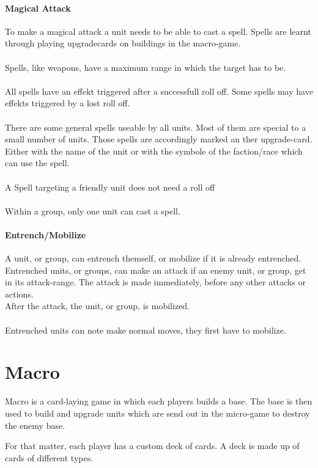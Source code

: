 \documentclass[a5paper,pagesize,10pt,bibtotoc,pointlessnumbers,
normalheadings,DIV=9,twoside=false]{scrbook}
\begin{document}
\subsubsection{Magical Attack}
To make a magical attack a unit needs to be able to cast a spell. Spells are learnt through playing upgradecards on buildings in the macro-game.\\
\\
Spells, like weapons, have a maximum range in which the target has to be.\\
\\
All spells have an effekt triggered after a successfull roll off. Some spells may have effekts triggered by a lost roll off.\\
\\
There are some general spells useable by all units. Most of them are special to a small number of units. Those spells are accordingly marked an ther upgrade-card. Either with the name of the unit or with the symbole of the faction/race which can use the spell.\\
\\
A Spell targeting a friendly unit does not need a roll off\\
\\
Within a group, only one unit can cast a spell.

\subsubsection{Entrench/Mobilize}
A unit, or group, can entrench themself, or mobilize if it is already entrenched.
Entrenched units, or groups, can make an attack if an enemy unit, or group, get in its attack-range.
The attack is made immediately, before any other attacks or actions.\\
After the attack, the unit, or group, is mobilized.\\
\\
Entrenched units can note make normal moves, they first have to mobilize.

\chapter{Macro}
Macro is a card-laying game in which each players builds a base. The base is then used to build and upgrade units which are send out in the micro-game to destroy the enemy base.

For that matter, each player has a custom deck of cards. A deck is made up of cards of different types.
\end{document}
